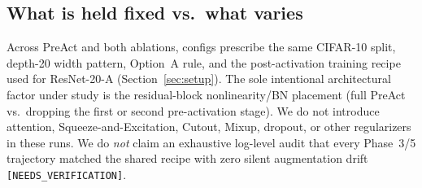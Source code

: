 \subsection{What is held fixed vs.\ what varies}
\label{sec:method-controls}

Across PreAct and both ablations, configs prescribe the same CIFAR-10 split, depth-20 width pattern,
Option~A rule, and the post-activation training recipe used for ResNet-20-A
(Section~\ref{sec:setup}).
The sole intentional architectural factor under study is the residual-block nonlinearity/BN placement
(full PreAct vs.\ dropping the first or second pre-activation stage).
We do not introduce attention, Squeeze-and-Excitation, Cutout, Mixup, dropout, or other
regularizers in these runs.
We do \emph{not} claim an exhaustive log-level audit that every Phase~3/5 trajectory matched the
shared recipe with zero silent augmentation drift
\texttt{[NEEDS\_VERIFICATION]}.
